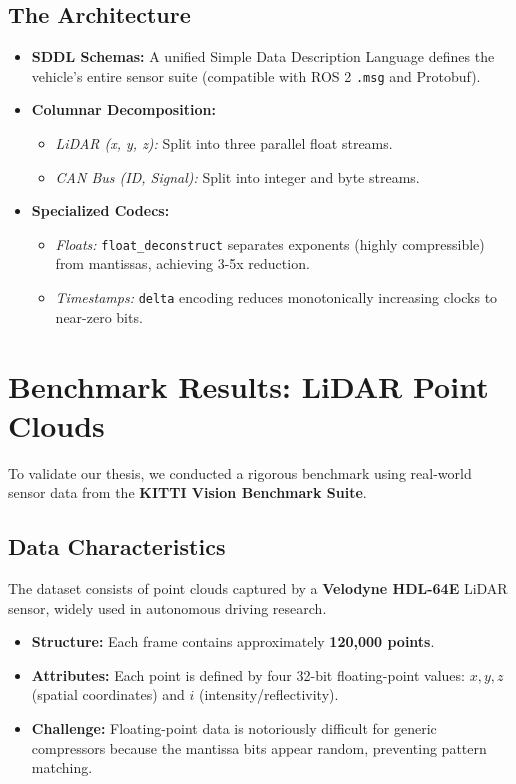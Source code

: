 \documentclass[11pt, letterpaper]{article}
\begin{document}
\subsection{The Architecture}
\begin{itemize}
    \item \textbf{SDDL Schemas:} A unified Simple Data Description Language defines the vehicle's entire sensor suite (compatible with ROS 2 \texttt{.msg} and Protobuf).
    \item \textbf{Columnar Decomposition:}
    \begin{itemize}
        \item \textit{LiDAR (x, y, z):} Split into three parallel float streams.
        \item \textit{CAN Bus (ID, Signal):} Split into integer and byte streams.
    \end{itemize}
    \item \textbf{Specialized Codecs:}
    \begin{itemize}
        \item \textit{Floats:} \texttt{float\_deconstruct} separates exponents (highly compressible) from mantissas, achieving 3-5x reduction.
        \item \textit{Timestamps:} \texttt{delta} encoding reduces monotonically increasing clocks to near-zero bits.
    \end{itemize}
\end{itemize}

\section{Benchmark Results: LiDAR Point Clouds}
To validate our thesis, we conducted a rigorous benchmark using real-world sensor data from the \textbf{KITTI Vision Benchmark Suite}.

\subsection{Data Characteristics}
The dataset consists of point clouds captured by a \textbf{Velodyne HDL-64E} LiDAR sensor, widely used in autonomous driving research.
\begin{itemize}
    \item \textbf{Structure:} Each frame contains approximately \textbf{120,000 points}.
    \item \textbf{Attributes:} Each point is defined by four 32-bit floating-point values: $x, y, z$ (spatial coordinates) and $i$ (intensity/reflectivity).
    \item \textbf{Challenge:} Floating-point data is notoriously difficult for generic compressors because the mantissa bits appear random, preventing pattern matching.
\end{itemize}
\end{document}
